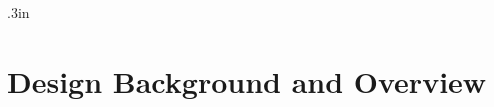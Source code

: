
\columnsep .3in
\twocolumn 
\sloppy
\raggedbottom
{}  

\part{Design Background and Overview}   
\label{background}





%
%


